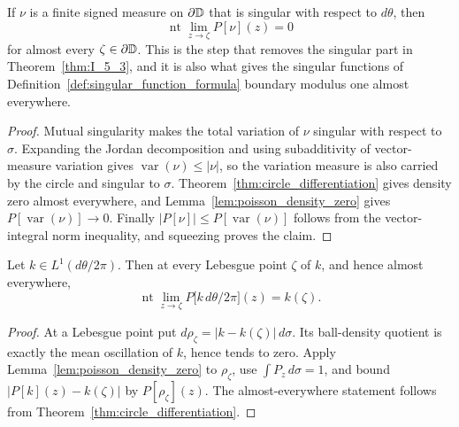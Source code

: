\begin{lemma}
  \label{lem:I_5_4}
  \leanok
  \mainline
  If $\nu$ is a finite signed measure on $\partial\mathbb{D}$ that is singular with
  respect to $d\theta$, then
  \[
    \operatorname{nt}\lim_{z\to\zeta}P[\nu](z)=0
  \]
  for almost every $\zeta\in\partial\mathbb{D}$. This is the step that removes the
  singular part in Theorem~\ref{thm:I_5_3}, and it is also what gives the
  singular functions of Definition~\ref{def:singular_function_formula} boundary
  modulus one almost everywhere.
  \begin{proof}
    \leanok
    Mutual singularity makes the total variation of $\nu$ singular with
    respect to $\sigma$. Expanding the Jordan decomposition and using
    subadditivity of vector-measure variation gives
    $\operatorname{var}(\nu)\le |\nu|$, so the variation measure is also
    carried by the circle and singular to $\sigma$. Theorem~\ref{thm:circle_differentiation}
    gives density zero almost everywhere, and Lemma~\ref{lem:poisson_density_zero}
    gives $P[\operatorname{var}(\nu)]\to0$. Finally
    $|P[\nu]|\le P[\operatorname{var}(\nu)]$ follows from the vector-integral
    norm inequality, and squeezing proves the claim.
  \end{proof}
\end{lemma}

\begin{theorem}
  \label{thm:I_5_3_ac}
  \leanok
  Let $k\in L^1(d\theta/2\pi)$. Then at every Lebesgue point $\zeta$ of $k$,
  and hence almost everywhere,
  \[
    \operatorname{nt}\lim_{z\to\zeta}P\bigl[k\,d\theta/2\pi\bigr](z)=k(\zeta).
  \]
  \begin{proof}
    \leanok
    At a Lebesgue point put
    $d\rho_\zeta=|k-k(\zeta)|\,d\sigma$. Its ball-density quotient is exactly
    the mean oscillation of $k$, hence tends to zero. Apply
    Lemma~\ref{lem:poisson_density_zero} to $\rho_\zeta$, use
    $\int P_z\,d\sigma=1$, and bound
    $|P[k](z)-k(\zeta)|$ by $P[\rho_\zeta](z)$. The almost-everywhere statement
    follows from Theorem~\ref{thm:circle_differentiation}.
  \end{proof}
\end{theorem}

